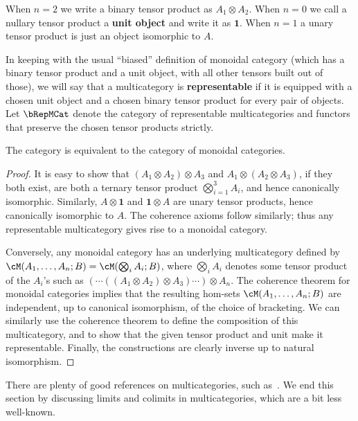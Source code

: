 \documentclass{book}
\def\one{\mathbf{1}}
\let\tensor\otimes
\let\bigtensor\bigotimes
\begin{document}
When $n=2$ we write a binary tensor product as $A_1\tensor A_2$.
When $n=0$ we call a nullary tensor product a \textbf{unit object} and write it as $\one$.
When $n=1$ a unary tensor product is just an object isomorphic to $A$.

In keeping with the usual ``biased'' definition of monoidal category (which has a binary tensor product and a unit object, with all other tensors built out of those), we will say that a multicategory is \textbf{representable} if it is equipped with a chosen unit object and a chosen binary tensor product for every pair of objects.
Let $\bRepMCat$ denote the category of representable multicategories and functors that preserve the chosen tensor products strictly.

\begin{thm}\label{thm:multicat-repr}
  The category \bRepMCat is equivalent to the category \bMonCat of monoidal categories.
\end{thm}
\begin{proof}
  It is easy to show that $(A_1\tensor A_2)\tensor A_3$ and $A_1 \tensor (A_2\tensor A_3)$, if they both exist, are both a ternary tensor product $\bigtensor_{i=1}^3 A_i$, and hence canonically isomorphic.
  Similarly, $A\tensor \one$ and $\one\tensor A$ are unary tensor products, hence canonically isomorphic to $A$.
  The coherence axioms follow similarly; thus any representable multicategory gives rise to a monoidal category.

  Conversely, any monoidal category \cM has an underlying multicategory defined by $\cM(A_1,\dots,A_n;B) = \cM(\bigtensor_i A_i;B)$, where $\bigtensor_i A_i$ denotes some tensor product of the $A_i$'s such as $(\cdots((A_1\tensor A_2)\tensor A_3)\cdots )\tensor A_n$.
  The coherence theorem for monoidal categories implies that the resulting hom-sets $\cM(A_1,\dots,A_n;B)$ are independent, up to canonical isomorphism, of the choice of bracketing.
  We can similarly use the coherence theorem to define the composition of this multicategory, and to show that the given tensor product and unit make it representable.
  Finally, the constructions are clearly inverse up to natural isomorphism.
\end{proof}

There are plenty of good references on multicategories, such as~\cite{hermida:multicats,leinster:higher-opds}.
We end this section by discussing limits and colimits in multicategories, which are a bit less well-known.

\end{document}
